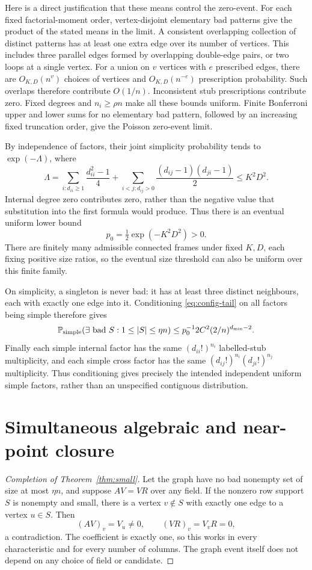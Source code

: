 \documentclass[11pt]{article}
\newcommand{\Prob}{\mathbb P}
\begin{document}
Here is a direct justification that these means control the zero-event.
For each fixed factorial-moment order, vertex-disjoint elementary bad
patterns give the product of the stated means in the limit. A
consistent overlapping collection of distinct patterns has at least one
extra edge over its number of vertices. This includes three parallel
edges formed by overlapping double-edge pairs, or two loops at a
single vertex. For a union on $v$ vertices with $e$ prescribed edges,
there are $O_{K,D}(n^v)$ choices of vertices and $O_{K,D}(n^{-e})$
prescription probability. Such overlaps therefore contribute $O(1/n)$.
Inconsistent stub prescriptions contribute zero. Fixed degrees and
$n_i\ge\rho n$ make all these bounds uniform. Finite Bonferroni
upper and lower sums for no elementary bad pattern, followed by an
increasing fixed truncation order, give the Poisson zero-event limit.

By independence of factors, their joint simplicity probability tends to
$\exp(-\Lambda)$, where
\[
 \Lambda=
 \sum_{i:d_{ii}\ge1}\frac{d_{ii}^2-1}4
 +\sum_{i<j:d_{ij}>0}\frac{(d_{ij}-1)(d_{ji}-1)}2
 \le K^2D^2.
\]
Internal degree zero contributes zero, rather than the negative value
that substitution into the first formula would produce. Thus there is
an eventual uniform lower bound
\[
 p_0=\tfrac12\exp(-K^2D^2)>0.
\]
There are finitely many admissible connected frames under fixed $K,D$,
each fixing positive size ratios, so the eventual size threshold can
also be uniform over this finite family.

On simplicity, a singleton is never bad: it has at least three distinct
neighbours, each with exactly one edge into it. Conditioning
\eqref{eq:config-tail} on all factors being simple therefore gives
\[
 \Prob_{\rm simple}(\exists\text{ bad }S:1\le|S|\le\eta n)
 \le p_0^{-1}2C^2(2/n)^{d_{\min}-2}.
\]
Finally each simple internal factor has the same $(d_{ii}!)^{n_i}$
labelled-stub multiplicity, and each simple cross factor has the same
$(d_{ij}!)^{n_i}(d_{ji}!)^{n_j}$ multiplicity. Thus conditioning gives
precisely the intended independent uniform simple factors, rather than
an unspecified contiguous distribution.

\section{Simultaneous algebraic and near-point closure}
\begin{proof}[Completion of Theorem~\ref{thm:small}]
Let the graph have no bad nonempty set of size at most $\eta n$, and
suppose $AV=VR$ over any field. If the nonzero row support $S$ is
nonempty and small, there is a vertex $v\notin S$ with exactly one
edge to a vertex $u\in S$. Then
\[
 (AV)_v=V_u\ne0,\qquad (VR)_v=V_vR=0,
\]
a contradiction. The coefficient is exactly one, so this works in
every characteristic and for every number of columns. The graph
event itself does not depend on any choice of field or candidate.
\end{proof}
\end{document}
